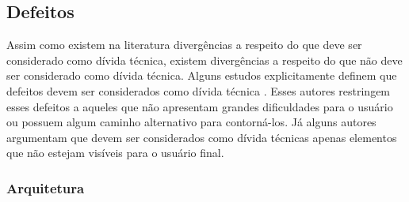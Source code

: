 \subsection{Defeitos}

Assim como existem na literatura divergências a respeito do que deve ser considerado como dívida técnica, existem divergências a respeito do que não deve ser considerado como dívida técnica. Alguns estudos explicitamente definem que defeitos devem ser considerados como dívida técnica \cite{davis2013driving,guo2011portfolio,xuan2012debt}. Esses autores restringem esses defeitos a aqueles que não apresentam grandes dificuldades para o usuário ou possuem algum caminho alternativo para contorná-los. Já alguns autores argumentam que devem ser considerados como dívida técnicas apenas elementos que não estejam visíveis para o usuário final\cite{kruchten2013technical}. 

\subsubsection{Arquitetura}
\label{tipo_td_arquitetura}

